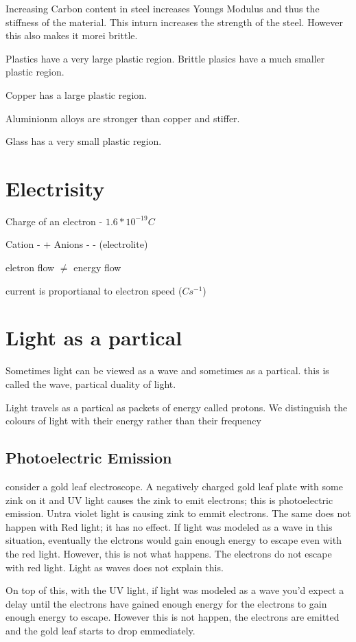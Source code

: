 \documentclass{article}
\begin{document}
Increasing Carbon content  in steel increases Youngs Modulus and thus the stiffness of the material. This inturn increases
the strength of the steel. However this also makes it morei brittle.

Plastics have a very large plastic region. Brittle plasics have a much smaller plastic region.

Copper has a large plastic region. 

Aluminionm alloys are stronger than copper and stiffer.

Glass has a very small plastic region.

\section{Electrisity}

Charge of an electron - $1.6 * 10 ^ {-19}C$

Cation - +
Anions - -
(electrolite)

eletron flow $\ne$ energy flow

current is proportianal to electron speed ($\si{Cs^{-1}}$)

\break 

\section{Light as a partical}
Sometimes light can be viewed as a wave and sometimes as a partical. this is called
the wave, partical duality of light.

Light travels as a partical as packets of energy called protons. We distinguish the colours of 
light with their energy rather than their frequency

\subsection{Photoelectric Emission}
consider a gold leaf electroscope. A negatively charged gold leaf plate with
some zink on it and UV light causes the zink to emit electrons; this is photoelectric
emission. Untra violet light is causing zink to emmit electrons. The same does
not happen with Red light; it has no effect. If light was modeled as a wave in
this situation, eventually the elctrons would gain enough energy to escape even
with the red light. However, this is not what happens. The electrons do not
escape with red light. Light as waves does not explain this.

On top of this, with the UV light, if light was modeled as a wave you'd expect a
delay until the electrons have gained enough energy for the electrons to gain
enough energy to escape. However this is not happen, the electrons are emitted
and the gold leaf starts to drop emmediately.
\end{document}
